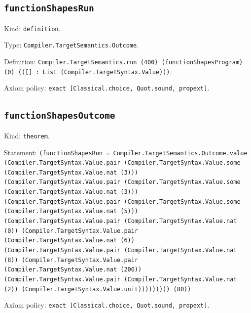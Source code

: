 \documentclass[11pt]{article}
\begin{document}
\subsection*{\texttt{functionShapesRun}}
\noindent Kind: \texttt{definition}.\par
\noindent Type: \texttt{Compiler.TargetSemantics.Outcome}.\par
\noindent Definition: \texttt{Compiler.TargetSemantics.run (400) (functionShapesProgram) (0) (([] : List (Compiler.TargetSyntax.Value)))}.\par
\noindent Axiom policy: \texttt{exact [Classical.choice, Quot.sound, propext]}.\par
\subsection*{\texttt{functionShapesOutcome}}
\noindent Kind: \texttt{theorem}.\par
\noindent Statement: \texttt{(functionShapesRun = Compiler.TargetSemantics.Outcome.value (Compiler.TargetSyntax.Value.pair (Compiler.TargetSyntax.Value.some (Compiler.TargetSyntax.Value.nat (3))) (Compiler.TargetSyntax.Value.pair (Compiler.TargetSyntax.Value.some (Compiler.TargetSyntax.Value.nat (3))) (Compiler.TargetSyntax.Value.pair (Compiler.TargetSyntax.Value.some (Compiler.TargetSyntax.Value.nat (5))) (Compiler.TargetSyntax.Value.pair (Compiler.TargetSyntax.Value.nat (0)) (Compiler.TargetSyntax.Value.pair (Compiler.TargetSyntax.Value.nat (6)) (Compiler.TargetSyntax.Value.pair (Compiler.TargetSyntax.Value.nat (8)) (Compiler.TargetSyntax.Value.pair (Compiler.TargetSyntax.Value.nat (200)) (Compiler.TargetSyntax.Value.pair (Compiler.TargetSyntax.Value.nat (2)) (Compiler.TargetSyntax.Value.unit))))))))) (80))}.\par
\noindent Axiom policy: \texttt{exact [Classical.choice, Quot.sound, propext]}.\par
\end{document}
